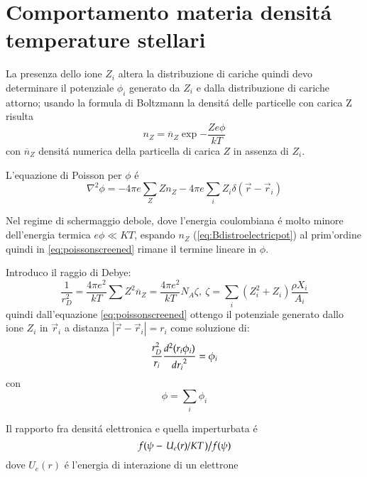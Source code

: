 \section{Comportamento materia densit\'a temperature stellari}

La presenza dello ione $Z_i$ altera la distribuzione di cariche quindi devo determinare il potenziale $\phi_i$ generato da $Z_i$ e dalla distribuzione di cariche attorno; usando la formula di Boltzmann la densit\'a delle particelle con carica Z risulta
\begin{equation}\label{eq:Bdistroelectricpot}
n_Z=\overline{n}_Z\exp{-\frac{Ze\phi}{kT}}
\end{equation}
con $\overline{n}_Z$ densit\'a numerica della particella di carica $Z$ in assenza di $Z_i$.

L'equazione di Poisson per $\phi$ \'e
\begin{equation}\label{eq:poissonscreened}
\nabla^2\phi=-4\pi e\sum_Z Zn_Z-4\pi e\sum_i Z_i\delta(\vec{r}-\vec{r}_i)
\end{equation}

Nel regime di schermaggio debole, dove l'energia coulombiana \'e molto minore dell'energia termica $e\phi\ll KT$, espando $n_Z$ (\eqref{eq:Bdistroelectricpot}) al prim'ordine quindi in \eqref{eq:poissonscreened} rimane il termine lineare in $\phi$.

Introduco il raggio di Debye:
\begin{equation}
\frac{1}{r_D^2}=\frac{4\pi e^2}{kT}\sum Z^2\overline{n}_Z=\frac{4\pi e^2}{kT}N_A\zeta,\ \zeta=\sum_{i}(Z_i^2+Z_i)\frac{\rho X_i}{A_i}\label{eq:debyeradius}
\end{equation}
quindi dall'equazione \eqref{eq:poissonscreened} ottengo il potenziale generato dallo ione $Z_i$ in $\vec{r}_i$ a distanza $|\vec{r}-\vec{r}_i|=r_i$ come soluzione di:
\begin{equation}\label{eq:poissonspheric}
\frac{r_D^2}{r_i}\TtwoDy{r_i}{(r_i\phi_i)}=\phi_i
\end{equation}
con
\begin{equation}
\phi=\sum_i\phi_i
\end{equation}

\begin{workout}
Il rapporto fra densit\'a elettronica e quella imperturbata \'e
\begin{equation}
\midfrac{f(\psi-\midfrac{U_e(r)}{KT})}{f(\psi)}
\end{equation}
dove $U_e(r)$ \'e l'energia di interazione di un elettrone
\end{workout}

